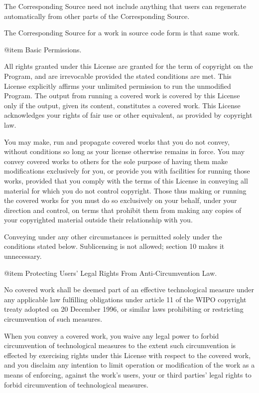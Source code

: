 The Corresponding Source need not include anything that users can
regenerate automatically from other parts of the Corresponding Source.

The Corresponding Source for a work in source code form is that same
work.

@item Basic Permissions.

All rights granted under this License are granted for the term of
copyright on the Program, and are irrevocable provided the stated
conditions are met.  This License explicitly affirms your unlimited
permission to run the unmodified Program.  The output from running a
covered work is covered by this License only if the output, given its
content, constitutes a covered work.  This License acknowledges your
rights of fair use or other equivalent, as provided by copyright law.

You may make, run and propagate covered works that you do not convey,
without conditions so long as your license otherwise remains in force.
You may convey covered works to others for the sole purpose of having
them make modifications exclusively for you, or provide you with
facilities for running those works, provided that you comply with the
terms of this License in conveying all material for which you do not
control copyright.  Those thus making or running the covered works for
you must do so exclusively on your behalf, under your direction and
control, on terms that prohibit them from making any copies of your
copyrighted material outside their relationship with you.

Conveying under any other circumstances is permitted solely under the
conditions stated below.  Sublicensing is not allowed; section 10
makes it unnecessary.

@item Protecting Users' Legal Rights From Anti-Circumvention Law.

No covered work shall be deemed part of an effective technological
measure under any applicable law fulfilling obligations under article
11 of the WIPO copyright treaty adopted on 20 December 1996, or
similar laws prohibiting or restricting circumvention of such
measures.

When you convey a covered work, you waive any legal power to forbid
circumvention of technological measures to the extent such
circumvention is effected by exercising rights under this License with
respect to the covered work, and you disclaim any intention to limit
operation or modification of the work as a means of enforcing, against
the work's users, your or third parties' legal rights to forbid
circumvention of technological measures.

